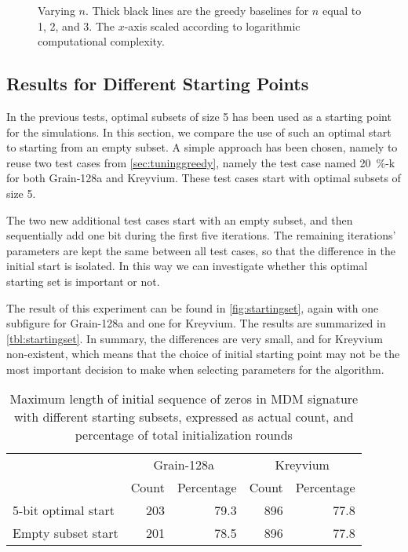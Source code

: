 {\begin{figure}[htbp]
	\caption{Varying $n$. Thick black lines are the greedy baselines for $n$ equal to 1, 2, and 3. The $x$-axis scaled according to logarithmic computational complexity.}
	\label{fig:ncomplexity}
\end{figure}

\subsection{Results for Different Starting Points}

In the previous tests, optimal subsets of size 5 has been used as a starting point for the simulations. In this section, we compare the use of such an optimal start to starting from an empty subset. A simple approach has been chosen, namely to reuse two test cases from \autoref{sec:tuninggreedy}, namely the test case named 20~\%-k for both Grain-128a and Kreyvium. These test cases start with optimal subsets of size 5.

The two new additional test cases start with an empty subset, and then sequentially add one bit during the first five iterations. The remaining  iterations' parameters are kept the same between all test cases, so that the difference in the initial start is isolated. In this way we can investigate whether this optimal starting set is important or not.

The result of this experiment can be found in \autoref{fig:startingset}, again with one subfigure for Grain-128a and one for Kreyvium. The results are summarized in \autoref{tbl:startingset}. In summary, the differences are very small, and for Kreyvium non-existent, which means that the choice of initial starting point may not be the most important decision to make when selecting parameters for the algorithm.

\begin{table}[htb]
	\centering
    \caption{Maximum length of initial sequence of zeros in MDM signature with different starting subsets, expressed as actual count, and percentage of total initialization rounds}
    \begin{tabular}{lrrrr}
    	\toprule
        & \multicolumn{2}{c}{Grain-128a} & \multicolumn{2}{c}{Kreyvium} \\
        \cmidrule(r){2-3} \cmidrule(l){4-5}
                  & Count & Percentage & Count & Percentage \\
        \midrule
        5-bit optimal start & 203 & 79.3 & 896 & 77.8 \\
        Empty subset start & 201 & 78.5 & 896 & 77.8 \\
        \bottomrule
    \end{tabular}
    \label{tbl:startingset}
\end{table}


}
